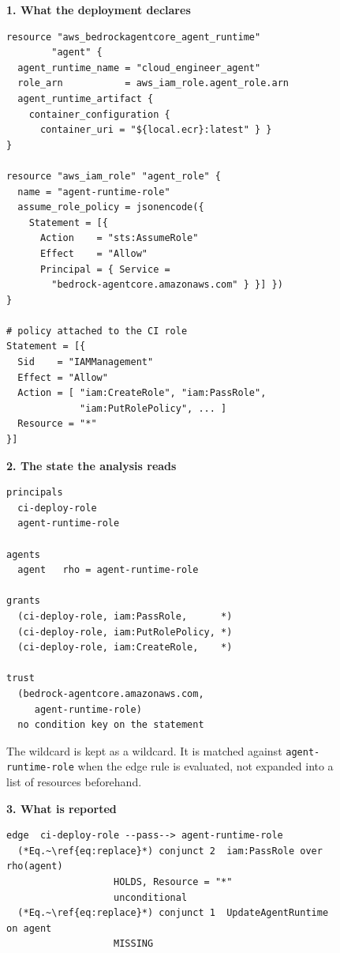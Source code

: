 \begin{figure}[t]
\centering
\begin{minipage}[t]{0.325\textwidth}
\textbf{\small 1. What the deployment declares}
\begin{lstlisting}
resource "aws_bedrockagentcore_agent_runtime"
        "agent" {
  agent_runtime_name = "cloud_engineer_agent"
  role_arn           = aws_iam_role.agent_role.arn
  agent_runtime_artifact {
    container_configuration {
      container_uri = "${local.ecr}:latest" } }
}

resource "aws_iam_role" "agent_role" {
  name = "agent-runtime-role"
  assume_role_policy = jsonencode({
    Statement = [{
      Action    = "sts:AssumeRole"
      Effect    = "Allow"
      Principal = { Service =
        "bedrock-agentcore.amazonaws.com" } }] })
}

# policy attached to the CI role
Statement = [{
  Sid    = "IAMManagement"
  Effect = "Allow"
  Action = [ "iam:CreateRole", "iam:PassRole",
             "iam:PutRolePolicy", ... ]
  Resource = "*"
}]
\end{lstlisting}
\end{minipage}\hfill
\begin{minipage}[t]{0.325\textwidth}
\textbf{\small 2. The state the analysis reads}
\begin{lstlisting}
principals
  ci-deploy-role
  agent-runtime-role

agents
  agent   rho = agent-runtime-role

grants
  (ci-deploy-role, iam:PassRole,      *)
  (ci-deploy-role, iam:PutRolePolicy, *)
  (ci-deploy-role, iam:CreateRole,    *)

trust
  (bedrock-agentcore.amazonaws.com,
     agent-runtime-role)
  no condition key on the statement
\end{lstlisting}
\vspace{2pt}
{\scriptsize The wildcard is kept as a wildcard. It is matched against
\texttt{agent-runtime-role} when the edge rule is evaluated, not expanded into
a list of resources beforehand.}
\end{minipage}\hfill
\begin{minipage}[t]{0.325\textwidth}
\textbf{\small 3. What is reported}
\begin{lstlisting}
edge  ci-deploy-role --pass--> agent-runtime-role
  (*Eq.~\ref{eq:replace}*) conjunct 2  iam:PassRole over rho(agent)
                   HOLDS, Resource = "*"
                   unconditional
  (*Eq.~\ref{eq:replace}*) conjunct 1  UpdateAgentRuntime on agent
                   MISSING


\end{lstlisting}
\end{minipage}
\end{figure}
